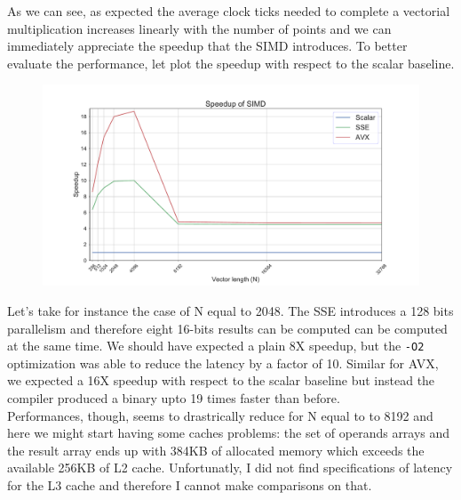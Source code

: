 \documentclass[paper=a4, fontsize=12pt]{scrartcl} %
\numberwithin{equation}{section}
\numberwithin{figure}{section}
\numberwithin{table}{section}
\begin{document}
As we can see, as expected the average clock ticks needed to complete a vectorial multiplication
increases linearly with the number of points and we can immediately appreciate the
speedup that the SIMD introduces. To better evaluate the performance, let plot the
speedup with respect to the scalar baseline.\\

\begin{figure}[!ht]
    \includegraphics[width=\textwidth]{speedup_O2.pdf}
\end{figure}

Let's take for instance the case of N equal to 2048. The SSE introduces a 128 bits
parallelism and therefore eight 16-bits results can be computed can be computed at the
same time. We should have expected a plain 8X speedup, but the \texttt{-O2} optimization
was able to reduce the latency by a factor of 10. Similar for AVX, we expected a 16X
speedup with respect to the scalar baseline but instead the compiler produced a binary
upto 19 times faster than before. \\

Performances, though, seems to drastrically reduce for N equal to to 8192 and here
we might start having some caches problems: the set of operands arrays and the result
array ends up with 384KB of allocated memory which exceeds the available 256KB of L2 cache.
Unfortunatly, I did not find specifications of latency for the L3 cache and therefore
I cannot make comparisons on that.\\
\end{document}

